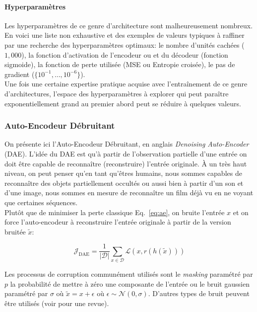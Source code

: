 \paragraph{Hyperparamètres} Les hyperparamètres de ce genre d'architecture sont
malheureusement nombreux. En voici une liste non exhaustive et des exemples de
valeurs typiques à raffiner par une recherche des hyperparamètres optimaux: le
nombre d'unités cachées ($1,000$), la fonction d'activation de l'encodeur ou et
du décodeur (fonction sigmoide), la fonction de perte utilisée (MSE ou Entropie
croisée), le pas de gradient ($\lbrace 10^{-1},\dots,10^{-6}\rbrace$).  \\

Une fois une certaine expertise pratique acquise avec l'entraînement de ce genre
d'architectures, l'espace des hyperparamètres à explorer qui peut paraître
exponentiellement grand au premier abord peut se réduire à quelques valeurs.


\subsubsection{Auto-Encodeur Débruitant}

On présente ici l'Auto-Encodeur Débruitant, en anglais \textit{Denoising
Auto-Encoder} (DAE).  L'idée du DAE est qu'à partir de l'observation partielle
d'une entrée on doit être capable de reconnaître (reconstruire) l'entrée
originale. À un très haut niveau, on peut penser qu'en tant qu'êtres humains,
nous sommes capables de reconnaître des objets partiellement occultés ou aussi
bien à partir d'un son et d'une image, nous sommes en mesure de reconnaître un
film déjà vu en ne voyant que certaines séquences.  \\

Plutôt que de minimiser la perte classique Eq.~\ref{eq:ae}, on bruite l'entrée
$x$ et on force l'auto-encodeur à reconstruire l'entrée originale à partir de
la version bruitée $\tilde{x}$:

\begin{equation}
\mathcal{J}_{\textrm{DAE}} = \frac{1}{\vert \mathcal{D}\vert}\sum_{x\in\mathcal{D}}\mathcal{L}(x,r(h(\tilde{x})))
\label{eq:dae}
\end{equation}

Les processus de corruption communément utilisés sont le \textit{masking}
paramétré par $p$ la probabilité de mettre à zéro une composante de l'entrée ou
le bruit gaussien paramétré par $\sigma$ où $\tilde{x} = x + \epsilon$ où
$\epsilon \sim \mathcal{N}(0,\sigma)$. D'autres types de bruit
peuvent être utilisés (voir \cite{Vincent-JMLR-2010} pour une revue).

